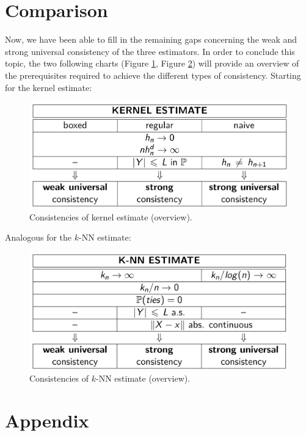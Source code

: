 \section{Comparison}
Now, we have been able to fill in the remaining gaps concerning the weak and strong universal consistency of the three estimators. In order to conclude this topic, the two following charts (Figure \ref{comp_kernel}, Figure \ref{comp_knn}) will provide an overview of the prerequisites required to achieve the different types of consistency. Starting for the kernel estimate:

\begin{figure}[h] \label{comp_kernel}
    \includegraphics[scale=0.15]{comp_kernel.jpeg}
    \centering
    \caption{Consistencies of kernel estimate (overview).}
\end{figure}

Analogous for the $k$-NN estimate:

\begin{figure}[h] \label{comp_knn}
    \includegraphics[scale=0.139]{comp_knn.jpeg}
    \centering
    \caption{Consistencies of $k$-NN estimate (overview).}
\end{figure}


\newpage

\appendix
\section{Appendix}

